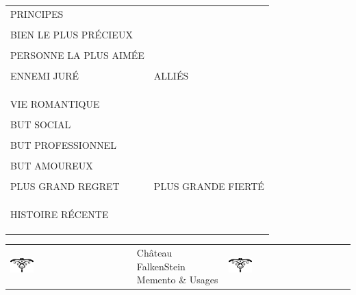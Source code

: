 \documentclass[a5paper,pagesize,french]{book}
\begin{document}
\begin{tabular}[c]{ p{} p{} }
	PRINCIPES				&									\\
							&									\\
	BIEN LE PLUS PRÉCIEUX	&									\\
							&									\\
	PERSONNE LA PLUS AIMÉE	&									\\
							&									\\
	ENNEMI JURÉ				&		ALLIÉS						\\
							&									\\
							&									\\
							&									\\
	VIE ROMANTIQUE			&									\\
							&									\\
	BUT SOCIAL				&									\\
							&									\\
	BUT PROFESSIONNEL		&									\\
							&									\\
	BUT AMOUREUX			&									\\
							&									\\
	PLUS GRAND REGRET		&		PLUS GRANDE FIERTÉ			\\
							&									\\
							&									\\
							&									\\
	HISTOIRE RÉCENTE		&									\\
							&									\\
							&									\\
							&									\\
\end{tabular}

\clearpage

\begin{center}
	\begin{tabular}[c]{ p{} p{} p{} }
		\includegraphics[width=0.20\textwidth]{../../images/artsdecos/ornement03whiteBG.png} & 
			\centering
			{ \Huge{\setmainfont{Chomsky} Château FalkenStein } }~\newline~\newline~\newline
			{ \LARGE{ \setmainfont{Z003} Memento \& Usages } }
		& \includegraphics[width=0.20\textwidth]{../../images/artsdecos/ornement03whiteBG.png} \\
	\end{tabular}
\end{center}
\end{document}
